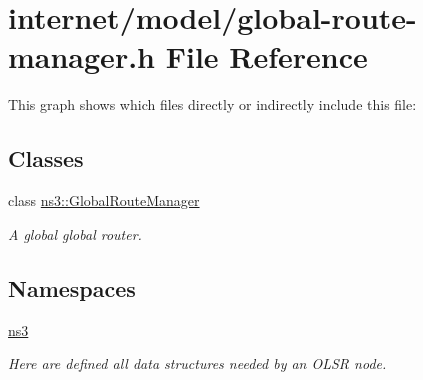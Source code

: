 \hypertarget{global-route-manager_8h}{}\section{internet/model/global-\/route-\/manager.h File Reference}
\label{global-route-manager_8h}
This graph shows which files directly or indirectly include this file\+:
\subsection*{Classes}
\begin{DoxyCompactItemize}
\item 
class \hyperlink{classns3_1_1GlobalRouteManager}{ns3\+::\+Global\+Route\+Manager}
\begin{DoxyCompactList}\small\item\em A global global router. \end{DoxyCompactList}\end{DoxyCompactItemize}
\subsection*{Namespaces}
\begin{DoxyCompactItemize}
\item 
 \hyperlink{namespacens3}{ns3}
\begin{DoxyCompactList}\small\item\em Here are defined all data structures needed by an O\+L\+SR node. \end{DoxyCompactList}\end{DoxyCompactItemize}

